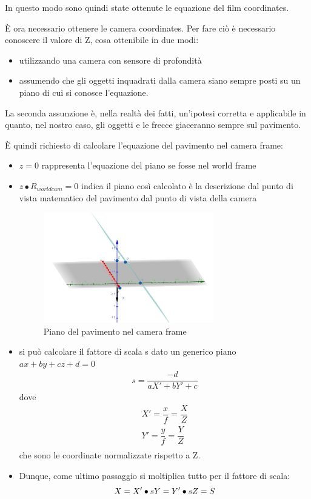 In questo modo sono quindi state ottenute le equazione del film coordinates. 

È ora necessario ottenere le camera coordinates. Per fare ciò è necessario conoscere il valore di Z, cosa ottenibile in due modi:
\begin{itemize}
	\item utilizzando una camera con sensore di profondità
	\item assumendo che gli oggetti inquadrati dalla camera siano sempre posti su un piano di cui si conosce l'equazione.
\end{itemize}
La seconda assunzione è, nella realtà dei fatti, un'ipotesi corretta e applicabile in quanto, nel nostro caso, gli oggetti e le frecce giaceranno sempre sul pavimento.

È quindi richiesto di calcolare l'equazione del pavimento nel camera frame:
\begin{itemize}
	\item $z = 0$ rappresenta l'equazione del piano se fosse nel world frame
	\item $z \bullet R_{worldcam} = 0$ indica il piano così calcolato è la descrizione dal punto di vista matematico del pavimento dal punto di vista della camera
	\begin{figure}[H]
		\centering
		\includegraphics[width=0.7\textwidth]{Immagini/piano_camera.jpeg}
		\caption{Piano del pavimento nel camera frame}
		\label{fig:piano_camera}
	\end{figure}
	\item si può calcolare il fattore di scala s dato un generico piano $ax+by+cz+d=0$
		\begin{equation}
		\begin{split}
		s = \dfrac{-d}{aX'+bY'+c}	
		\end{split}
		\end{equation}
	dove
		\begin{equation}
		\begin{split}
		X'=\dfrac{x}{f}=\dfrac{X}{Z}\\
		Y'=\dfrac{y}{f}=\dfrac{Y}{Z} \\
		\end{split}
		\end{equation}
	che sono le coordinate normalizzate rispetto a Z.
	\item Dunque, come ultimo passaggio si moltiplica tutto per il fattore di scala:
		\begin{equation}
		X=X' \bullet s\\
		Y=Y' \bullet s\\
		Z=S
		\end{equation}
\end{itemize}

